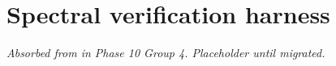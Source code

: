 \chapter{Spectral verification harness}
\label{chap:dev-spectral-verification}

\textit{Absorbed from
 in
Phase 10 Group 4. Placeholder until migrated.}
